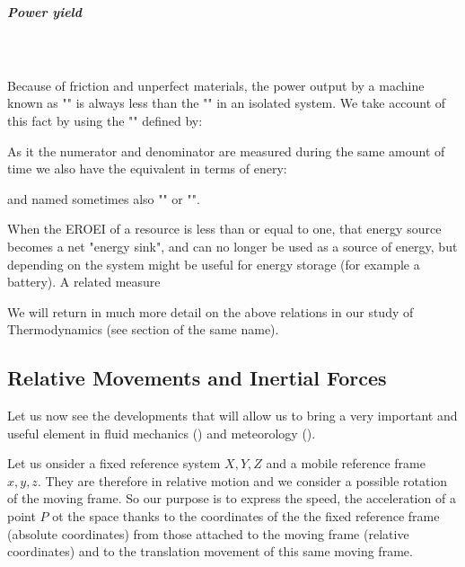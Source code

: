 	
	\subparagraph{Power yield}\mbox{}\\\\
	Because of friction and unperfect materials, the power output by a machine known as "" is always less than the "" in an isolated system. We take account of this fact by using the "" defined by:
	
	As it the numerator and denominator are measured during the same amount of time we also have the equivalent in terms of enery:
	
	 and named sometimes also ""  or "".

	When the EROEI of a resource is less than or equal to one, that energy source becomes a net "energy sink", and can no longer be used as a source of energy, but depending on the system might be useful for energy storage (for example a battery). A related measure 

	We will return in much more detail on the above relations in our study of Thermodynamics (see section of the same name).
	
	\pagebreak
	\subsection{Relative Movements and Inertial Forces}
	Let us now see the developments that will allow us to bring a very important and useful element in fluid mechanics () and meteorology ().

	Let us onsider a fixed reference system $X, Y, Z$ and a mobile reference frame $x, y, z$. They are therefore in relative motion and we consider a possible rotation of the moving frame. So our purpose is to express the speed, the acceleration of a point $P$ ot the space thanks to the coordinates of the the fixed reference frame (absolute coordinates) from those attached to the moving frame (relative coordinates) and to the translation movement of this same moving frame.

